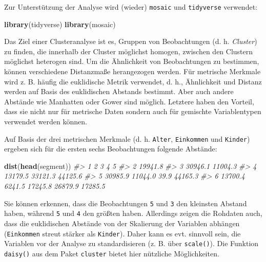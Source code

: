 \documentclass[12pt,]{book}
\newenvironment{Shaded}{\begin{snugshade}}{\end{snugshade}}
\newcommand{\KeywordTok}[1]{\textcolor[rgb]{0.13,0.29,0.53}{\textbf{{#1}}}}
\newcommand{\CommentTok}[1]{\textcolor[rgb]{0.56,0.35,0.01}{\textit{{#1}}}}
\newcommand{\NormalTok}[1]{{#1}}
\begin{document}
Zur Unterstützung der Analyse wird (wieder) \texttt{mosaic} und
\texttt{tidyverse} verwendet:

\begin{Shaded}
\begin{Highlighting}[]
\KeywordTok{library}\NormalTok{(tidyverse)}
\KeywordTok{library}\NormalTok{(mosaic)}
\end{Highlighting}
\end{Shaded}

Das Ziel einer Clusteranalyse ist es, Gruppen von Beobachtungen (d. h.
\emph{Cluster}) zu finden, die innerhalb der Cluster möglichst homogen,
zwischen den Clustern möglichst heterogen sind. Um die Ähnlichkeit von
Beobachtungen zu bestimmen, können verschiedene Distanzmaße herangezogen
werden. Für metrische Merkmale wird z. B. häufig die euklidische Metrik
verwendet, d. h., Ähnlichkeit und Distanz werden auf Basis des
euklidischen Abstands bestimmt. Aber auch andere Abstände wie Manhatten
oder Gower sind möglich. Letztere haben den Vorteil, dass sie nicht nur
für metrische Daten sondern auch für gemischte Variablentypen verwendet
werden können.

Auf Basis der drei metrischen Merkmale (d. h. \texttt{Alter},
\texttt{Einkommen} und \texttt{Kinder}) ergeben sich für die ersten
sechs Beobachtungen folgende Abstände:

\begin{Shaded}
\begin{Highlighting}[]
\KeywordTok{dist}\NormalTok{(}\KeywordTok{head}\NormalTok{(segment))}
\CommentTok{#>         1       2       3       4       5}
\CommentTok{#> 2 19941.8                                }
\CommentTok{#> 3 30946.1 11004.3                        }
\CommentTok{#> 4 13179.5 33121.3 44125.6                }
\CommentTok{#> 5 30985.9 11044.0    39.9 44165.3        }
\CommentTok{#> 6 13700.4  6241.5 17245.8 26879.9 17285.5}
\end{Highlighting}
\end{Shaded}

Sie können erkennen, dass die Beobachtungen \texttt{5} und \texttt{3}
den kleinsten Abstand haben, während \texttt{5} und \texttt{4} den
größten haben. Allerdings zeigen die Rohdaten auch, dass die
euklidischen Abstände von der Skalierung der Variablen abhängen
(\texttt{Einkommen} streut stärker als \texttt{Kinder}). Daher kann es
evt. sinnvoll sein, die Variablen vor der Analyse zu standardisieren (z.
B. über \texttt{scale()}). Die Funktion \texttt{daisy()} aus dem Paket
\texttt{cluster} bietet hier nützliche Möglichkeiten.
\end{document}
